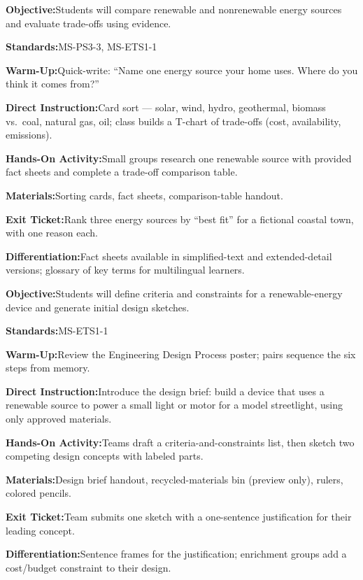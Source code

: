 \documentclass[11pt,a4paper,parskip=half]{scrartcl}
\newcommand{\dayline}[2]{%
  \noindent\small\textcolor{stemteal}{\textbf{#1}}\quad\small #2\par\smallskip
}
\begin{document}
\vspace{4pt}
\begin{tcolorbox}[daybox,title={Tuesday --- Renewable vs.\ Nonrenewable Sources}]
\dayline{Objective:}{Students will compare renewable and nonrenewable energy sources and evaluate trade-offs using evidence.}
\dayline{Standards:}{MS-PS3-3, MS-ETS1-1}
\dayline{Warm-Up:}{Quick-write: ``Name one energy source your home uses. Where do you think it comes from?''}
\dayline{Direct Instruction:}{Card sort --- solar, wind, hydro, geothermal, biomass vs.\ coal, natural gas, oil; class builds a T-chart of trade-offs (cost, availability, emissions).}
\dayline{Hands-On Activity:}{Small groups research one renewable source with provided fact sheets and complete a trade-off comparison table.}
\dayline{Materials:}{Sorting cards, fact sheets, comparison-table handout.}
\dayline{Exit Ticket:}{Rank three energy sources by ``best fit'' for a fictional coastal town, with one reason each.}
\dayline{Differentiation:}{Fact sheets available in simplified-text and extended-detail versions; glossary of key terms for multilingual learners.}
\end{tcolorbox}

\vspace{4pt}
\begin{tcolorbox}[daybox,title={Wednesday --- Engineering Design Challenge Launch}]
\dayline{Objective:}{Students will define criteria and constraints for a renewable-energy device and generate initial design sketches.}
\dayline{Standards:}{MS-ETS1-1}
\dayline{Warm-Up:}{Review the Engineering Design Process poster; pairs sequence the six steps from memory.}
\dayline{Direct Instruction:}{Introduce the design brief: build a device that uses a renewable source to power a small light or motor for a model streetlight, using only approved materials.}
\dayline{Hands-On Activity:}{Teams draft a criteria-and-constraints list, then sketch two competing design concepts with labeled parts.}
\dayline{Materials:}{Design brief handout, recycled-materials bin (preview only), rulers, colored pencils.}
\dayline{Exit Ticket:}{Team submits one sketch with a one-sentence justification for their leading concept.}
\dayline{Differentiation:}{Sentence frames for the justification; enrichment groups add a cost/budget constraint to their design.}
\end{tcolorbox}
\end{document}
